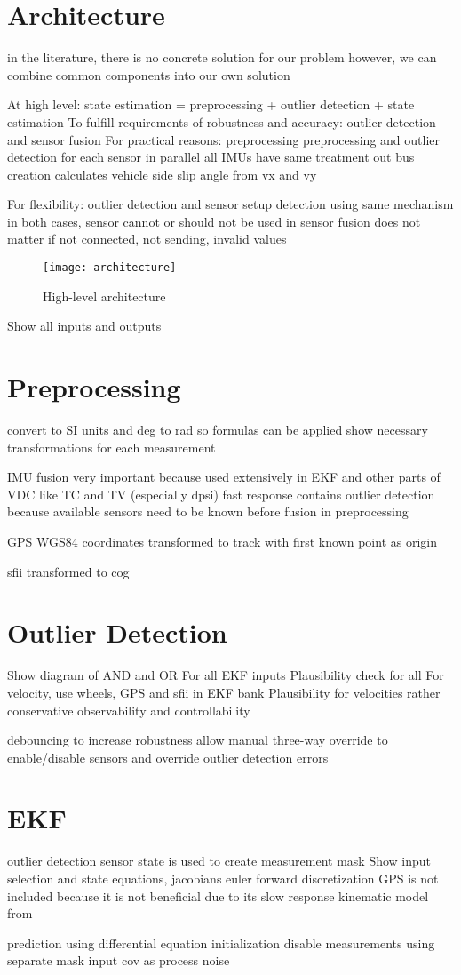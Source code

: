 \section{Architecture}
in the literature, there is no concrete solution for our problem
however, we can combine common components into our own solution

At high level: state estimation = preprocessing + outlier detection + state estimation
To fulfill requirements of robustness and accuracy: outlier detection and sensor fusion
For practical reasons: preprocessing
preprocessing and outlier detection for each sensor in parallel
all IMUs have same treatment
out bus creation calculates vehicle side slip angle from vx and vy

For flexibility: outlier detection and sensor setup detection using same mechanism
in both cases, sensor cannot or should not be used in sensor fusion
does not matter if not connected, not sending, invalid values

\begin{figure}[h]
	\centering
	\texttt{[image: architecture]}%
	\caption{High-level architecture}
	\label{fig:architecture}
\end{figure}
Show all inputs and outputs

\section{Preprocessing}
convert to SI units and deg to rad so formulas can be applied
show necessary transformations for each measurement

IMU fusion
very important because used extensively in EKF and other parts of VDC like TC and TV (especially dpsi)
fast response
contains outlier detection because available sensors need to be known before fusion in preprocessing

GPS WGS84 coordinates transformed to track with first known point as origin

sfii transformed to \gls{cog}

\section{Outlier Detection}
Show diagram of AND and OR
For all EKF inputs
Plausibility check for all
For velocity, use wheels, GPS and sfii in EKF bank
Plausibility for velocities rather conservative
observability and controllability

debouncing to increase robustness
allow manual three-way override to enable/disable sensors and override outlier detection errors

\section{EKF}
outlier detection sensor state is used to create measurement mask
Show input selection and state equations, jacobians
euler forward discretization
GPS is not included because it is not beneficial due to its slow response
kinematic model from~\cite[p.~156]{AlexanderWischnewski.2019}


prediction using differential equation
initialization
disable measurements using separate mask
input cov as process noise
